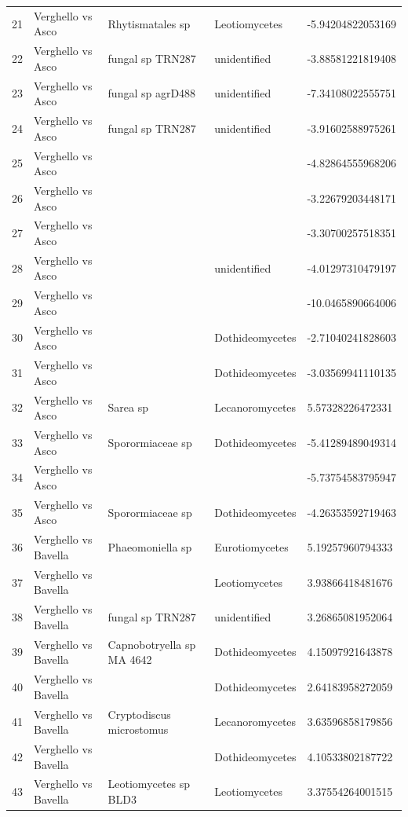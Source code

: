 \documentclass[12pt]{article}\usepackage[]{graphicx}\usepackage[]{color}
\numberwithin{figure}{section}
\begin{document}
\begin{table}[ht]
\begin{tabular}{lllll}
  21 & Verghello vs Asco & Rhytismatales sp & Leotiomycetes & -5.94204822053169 \\ 
  22 & Verghello vs Asco & fungal sp TRN287 & unidentified & -3.88581221819408 \\ 
  23 & Verghello vs Asco & fungal sp agrD488 & unidentified & -7.34108022555751 \\ 
  24 & Verghello vs Asco & fungal sp TRN287 & unidentified & -3.91602588975261 \\ 
  25 & Verghello vs Asco &  &  & -4.82864555968206 \\ 
  26 & Verghello vs Asco &  &  & -3.22679203448171 \\ 
  27 & Verghello vs Asco &  &  & -3.30700257518351 \\ 
  28 & Verghello vs Asco &  & unidentified & -4.01297310479197 \\ 
  29 & Verghello vs Asco &  &  & -10.0465890664006 \\ 
  30 & Verghello vs Asco &  & Dothideomycetes & -2.71040241828603 \\ 
  31 & Verghello vs Asco &  & Dothideomycetes & -3.03569941110135 \\ 
  32 & Verghello vs Asco & Sarea sp & Lecanoromycetes & 5.57328226472331 \\ 
  33 & Verghello vs Asco & Sporormiaceae sp & Dothideomycetes & -5.41289489049314 \\ 
  34 & Verghello vs Asco &  &  & -5.73754583795947 \\ 
  35 & Verghello vs Asco & Sporormiaceae sp & Dothideomycetes & -4.26353592719463 \\ 
  36 & Verghello vs Bavella & Phaeomoniella sp & Eurotiomycetes & 5.19257960794333 \\ 
  37 & Verghello vs Bavella &  & Leotiomycetes & 3.93866418481676 \\ 
  38 & Verghello vs Bavella & fungal sp TRN287 & unidentified & 3.26865081952064 \\ 
  39 & Verghello vs Bavella & Capnobotryella sp MA 4642 & Dothideomycetes & 4.15097921643878 \\ 
  40 & Verghello vs Bavella &  & Dothideomycetes & 2.64183958272059 \\ 
  41 & Verghello vs Bavella & Cryptodiscus microstomus & Lecanoromycetes & 3.63596858179856 \\ 
  42 & Verghello vs Bavella &  & Dothideomycetes & 4.10533802187722 \\ 
  43 & Verghello vs Bavella & Leotiomycetes sp BLD3 & Leotiomycetes & 3.37554264001515 \\ 

\end{tabular}
\end{table}
\end{document}
